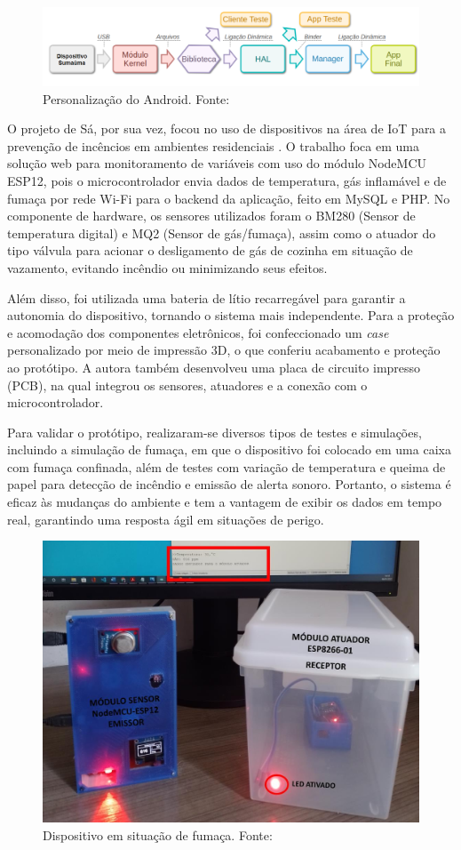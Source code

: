 \begin{figure}[ht]
    \centering
    \includegraphics[width=.87\textwidth]{img/smartlamp-overview.png}
    \caption{Personalização do Android. Fonte:\cite{ufam-aosp-sumama}}\label{figSumauma}
\end{figure}

O projeto de Sá, por sua vez, focou no uso de dispositivos na área de IoT para a prevenção de incêncios em ambientes residenciais \cite{uea-iot-deteccao-incendio}. O trabalho 
foca em uma solução web para monitoramento de variáveis com uso do módulo NodeMCU ESP12, pois o microcontrolador envia dados de temperatura, gás inflamável e de 
fumaça por rede Wi-Fi para o backend da aplicação, feito em MySQL e PHP. No componente de hardware, os sensores utilizados foram o BM280 (Sensor de temperatura digital) e MQ2 (Sensor de gás/fumaça), assim como 
o atuador do tipo válvula para acionar o desligamento de gás de cozinha em situação de vazamento, evitando incêndio ou minimizando seus efeitos. 

Além disso, foi utilizada uma bateria de lítio recarregável para garantir a autonomia do dispositivo, tornando o sistema mais independente. Para a proteção e acomodação dos componentes eletrônicos, foi 
confeccionado um \textit{case} personalizado por meio de impressão 3D, o que conferiu acabamento e proteção ao protótipo. A autora também desenvolveu uma placa de circuito impresso (PCB), na qual integrou os sensores, atuadores e
a conexão com o microcontrolador.

Para validar o protótipo, realizaram-se diversos tipos de testes e simulações, incluindo a simulação de fumaça, em que o dispositivo foi colocado em uma caixa com 
fumaça confinada, além de testes com variação de temperatura e queima de papel para detecção de incêndio e emissão de alerta sonoro. Portanto, o sistema é eficaz às mudanças do ambiente e 
tem a vantagem de exibir os dados em tempo real, garantindo uma resposta ágil em situações de perigo. 

\begin{figure}[ht]
    \centering
    \includegraphics[width=.44\textwidth]{img/sa-dispositivo-simulacao.png}
    \caption{Dispositivo em situação de fumaça. Fonte:\cite{uea-iot-deteccao-incendio}}\label{figProtitpoUEA}
\end{figure}
